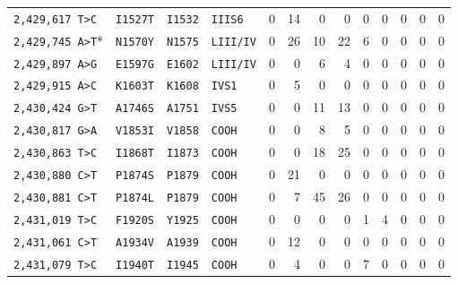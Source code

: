 \begin{tabular}{llllrrrrrrrrr}
\texttt{2,429,617 T>C} & \texttt{I1527T} & \texttt{I1532} & \texttt{IIIS6} & 0 & 14 & 0 & 0 & 0 & 0 & 0 & 0 & 0 \\

\texttt{2,429,745 A>T}* & \texttt{N1570Y} & \texttt{N1575} & \texttt{LIII/IV} & 0 & 26 & 10 & 22 & 6 & 0 & 0 & 0 & 0 \\

\texttt{2,429,897 A>G} & \texttt{E1597G} & \texttt{E1602} & \texttt{LIII/IV} & 0 & 0 & 6 & 4 & 0 & 0 & 0 & 0 & 0 \\

\texttt{2,429,915 A>C} & \texttt{K1603T} & \texttt{K1608} & \texttt{IVS1} & 0 & 5 & 0 & 0 & 0 & 0 & 0 & 0 & 0 \\

\texttt{2,430,424 G>T} & \texttt{A1746S} & \texttt{A1751} & \texttt{IVS5} & 0 & 0 & 11 & 13 & 0 & 0 & 0 & 0 & 0 \\

\texttt{2,430,817 G>A} & \texttt{V1853I} & \texttt{V1858} & \texttt{COOH} & 0 & 0 & 8 & 5 & 0 & 0 & 0 & 0 & 0 \\

\texttt{2,430,863 T>C} & \texttt{I1868T} & \texttt{I1873} & \texttt{COOH} & 0 & 0 & 18 & 25 & 0 & 0 & 0 & 0 & 0 \\

\texttt{2,430,880 C>T} & \texttt{P1874S} & \texttt{P1879} & \texttt{COOH} & 0 & 21 & 0 & 0 & 0 & 0 & 0 & 0 & 0 \\

\texttt{2,430,881 C>T} & \texttt{P1874L} & \texttt{P1879} & \texttt{COOH} & 0 & 7 & 45 & 26 & 0 & 0 & 0 & 0 & 0 \\

\texttt{2,431,019 T>C} & \texttt{F1920S} & \texttt{Y1925} & \texttt{COOH} & 0 & 0 & 0 & 0 & 1 & 4 & 0 & 0 & 0 \\

\texttt{2,431,061 C>T} & \texttt{A1934V} & \texttt{A1939} & \texttt{COOH} & 0 & 12 & 0 & 0 & 0 & 0 & 0 & 0 & 0 \\

\texttt{2,431,079 T>C} & \texttt{I1940T} & \texttt{I1945} & \texttt{COOH} & 0 & 4 & 0 & 0 & 7 & 0 & 0 & 0 & 0 \\

\bottomrule
\end{tabular}
